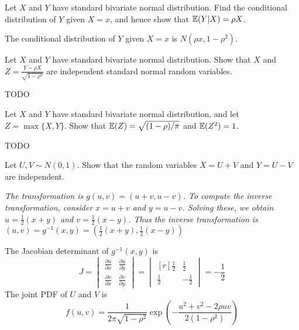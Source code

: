 \begin{exercise}
\begin{questions}
\question
Let $X$ and $Y$ have standard bivariate normal distribution. Find the conditional distribution of $Y$ given $X=x$, and hence show that $\mathbb{E}(Y|X) = \rho X$.
\begin{answer}
The conditional distribution of $Y$ given $X=x$ is $N(\rho x, 1-\rho^2)$.
\end{answer}
\question
Let $X$ and $Y$ have standard bivariate normal distribution. Show that $X$ and $\displaystyle Z=\frac{Y-\rho X}{\sqrt{1-\rho^2}}$ are independent standard normal random variables.
\begin{answer}
TODO
\end{answer}
\question
Let $X$ and $Y$ have standard bivariate normal distribution, and let $Z=\max\{X,Y\}$. Show that $\mathbb{E}(Z)=\sqrt{(1-\rho)/\pi}$ and $\mathbb{E}(Z^2)=1$.
\begin{answer}
TODO
\end{answer}
\question
Let $U,V\sim N(0,1)$. Show that the random variables $X = U+V$ and $Y = U-V$ are independent.

\begin{answer}
\bit
\it The transformation is $g(u,v) = (u+v,u-v)$. 
\it To compute the inverse transformation, consider $x=u+v$ and $y=u-v$. 
\it Solving these, we obtain $u = \frac{1}{2}(x+y)$ and $v = \frac{1}{2}(x-y)$.
\it Thus the inverse transformation is $(u,v) = g^{-1}(x,y) = \left(\frac{1}{2}(x+y),\frac{1}{2}(x-y)\right)$
\eit

The Jacobian determinant of $g^{-1}(x,y)$ is
\[
J = 
\begin{vmatrix}
\frac{\partial u}{\partial x}  & \frac{\partial u}{\partial y}  \\
\frac{\partial v}{\partial x}  & \frac{\partial v}{\partial y} 
\end{vmatrix}
=
\begin{vmatrix}[r]
\frac{1}{2}   &  \frac{1}{2} \\
\frac{1}{2}  & -\frac{1}{2}
\end{vmatrix}
=
-\frac{1}{2}
\]
The joint PDF of $U$ and $V$ is 
\[
f(u,v) = \frac{1}{2\pi \sqrt{1-\rho ^{2}}} \exp\left( -\frac{u^2 + v^2 - 2\rho uv}{2(1-\rho^2)} \right)
\]


\end{answer}
\end{questions}
\end{exercise}
